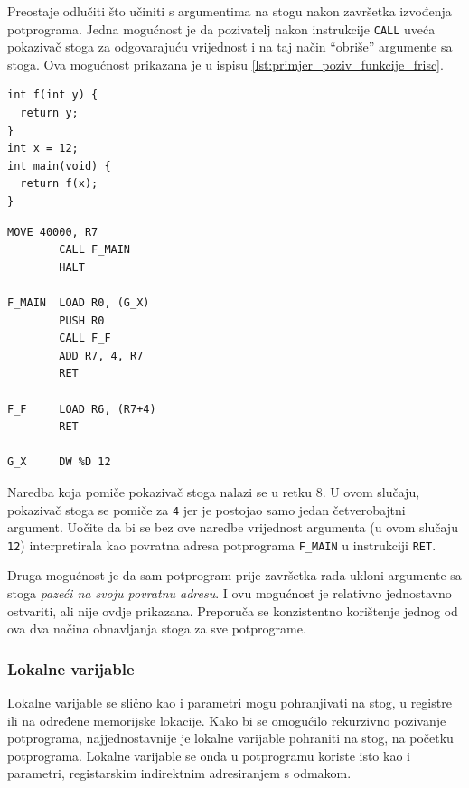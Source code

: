 \documentclass[times, 12pt, utf8]{book}
\begin{document}
Preostaje odlučiti što učiniti s argumentima na stogu nakon završetka izvođenja potprograma.
Jedna mogućnost je da pozivatelj nakon instrukcije \verb|CALL| uveća pokazivač stoga za odgovarajuću vrijednost i na taj način ``obriše'' argumente sa stoga.
Ova mogućnost prikazana je u ispisu \ref{lst:primjer_poziv_funkcije_frisc}.

\begin{lstlisting}[caption={Jednostavan \emph{ppjC} program s pozivom funkcije.},label=lst:primjer_poziv_funkcije]
int f(int y) {
  return y;
}
int x = 12;
int main(void) {
  return f(x);
}
\end{lstlisting}

\begin{lstlisting}[caption={Mogući generirani FRISC mnemonički program za ispis \ref{lst:primjer_poziv_funkcije}.},label=lst:primjer_poziv_funkcije_frisc]
        MOVE 40000, R7
        CALL F_MAIN
        HALT
        
F_MAIN  LOAD R0, (G_X)
        PUSH R0
        CALL F_F
        ADD R7, 4, R7
        RET

F_F     LOAD R6, (R7+4)
        RET

G_X     DW %D 12
\end{lstlisting}

Naredba koja pomiče pokazivač stoga nalazi se u retku 8.
U ovom slučaju, pokazivač stoga se pomiče za \verb|4| jer je postojao samo jedan četverobajtni argument.
Uočite da bi se bez ove naredbe vrijednost argumenta (u ovom slučaju \verb|12|) interpretirala kao povratna adresa potprograma \verb|F_MAIN| u instrukciji \verb|RET|.

Druga mogućnost je da sam potprogram prije završetka rada ukloni argumente sa stoga \emph{pazeći na svoju povratnu adresu}.
I ovu mogućnost je relativno jednostavno ostvariti, ali nije ovdje prikazana.
Preporuča se konzistentno korištenje jednog od ova dva načina obnavljanja stoga za sve potprograme.

\subsubsection{Lokalne varijable}
Lokalne varijable se slično kao i parametri mogu pohranjivati na stog, u registre ili na određene memorijske lokacije.
Kako bi se omogućilo rekurzivno pozivanje potprograma, najjednostavnije je lokalne varijable pohraniti na stog, na početku potprograma.
Lokalne varijable se onda u potprogramu koriste isto kao i parametri, registarskim indirektnim adresiranjem s odmakom.
\end{document}
